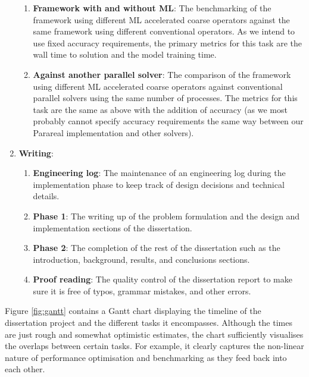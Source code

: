 \documentclass{article}
\begin{document}
\begin{enumerate}
\begin{enumerate}
        	\item \textbf{Framework with and without ML}: The benchmarking of the framework using different ML accelerated coarse operators against the same framework using different conventional operators. As we intend to use fixed accuracy requirements, the primary metrics for this task are the wall time to solution and the model training time.
        	\item \textbf{Against another parallel solver}: The comparison of the framework using different ML accelerated coarse operators against conventional parallel solvers using the same number of processes. The metrics for this task are the same as above with the addition of accuracy (as we most probably cannot specify accuracy requirements the same way between our Parareal implementation and other solvers).
        \end{enumerate}
    \item \textbf{Writing}:
        \begin{enumerate}
            \item \textbf{Engineering log}: The maintenance of an engineering log during the implementation phase to keep track of design decisions and technical details.
            \item \textbf{Phase 1}: The writing up of the problem formulation and the design and implementation sections of the dissertation.
            \item \textbf{Phase 2}: The completion of the rest of the dissertation such as the introduction, background, results, and conclusions sections.
        	\item \textbf{Proof reading}: The quality control of the dissertation report to make sure it is free of typos, grammar mistakes, and other errors.
        \end{enumerate}
\end{enumerate}

Figure \ref{fig:gantt} contains a Gantt chart displaying the timeline of the dissertation project and the different tasks it encompasses. Although the times are just rough and somewhat optimistic estimates, the chart sufficiently visualises the overlaps between certain tasks. For example, it clearly captures the non-linear nature of performance optimisation and benchmarking as they feed back into each other.
\end{document}
